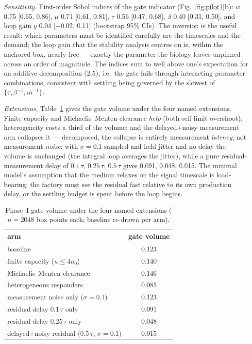 \documentclass[twoside,twocolumn,usenatbib]{mnras}
\begin{document}
\emph{Sensitivity.}  First-order Sobol indices of the gate indicator
(Fig.~\ref{fig:pilot1}b): $w$ 0.75 [0.65, 0.86], $\mu$ 0.71 [0.61,
0.81], $\tau$ 0.56 [0.47, 0.68], $\beta$ 0.40 [0.31, 0.50], and loop
gain $y$ 0.04 [$-0.02$, 0.11] (bootstrap 95\% CIs).  The inversion is
the useful result: which parameters must be identified carefully are
the timescales and the demand; the loop gain that the stability
analysis centres on is, within the anchored box, nearly free ---
exactly the parameter the biology leaves unpinned across an order of
magnitude.  The indices sum to well above one's expectation for an
additive decomposition (2.5), i.e.\ the gate fails through
interacting parameter combinations, consistent with settling being
governed by the slowest of $\{\tau, \beta^{-1}, m^{-1}\}$.

\emph{Extensions.}  Table~\ref{tab:ext} gives the gate volume under
the four named extensions.  Finite capacity and Michaelis--Menten
clearance \emph{help} (both self-limit overshoot); heterogeneity
costs a third of the volume; and the delayed+noisy measurement arm
collapses it --- decomposed, the collapse is entirely measurement
\emph{latency}, not measurement \emph{noise}: with $\sigma = 0.1$
sampled-and-held jitter and no delay the volume is unchanged (the
integral loop averages the jitter), while a pure residual-measurement
delay of $0.1\,\tau$, $0.25\,\tau$, $0.5\,\tau$ gives 0.091, 0.048,
0.015.  The minimal model's assumption that the medium relaxes on the
signal timescale is load-bearing: the factory must see the residual
fast relative to its own production delay, or the settling budget is
spent before the loop begins.

\begin{table}
\centering
\caption{Phase~I gate volume under the four named extensions
($n = 2048$ box points each; baseline re-drawn per arm).}
\label{tab:ext}
\begin{tabular}{lc}
\toprule
arm & gate volume \\
\midrule
baseline & 0.123 \\
finite capacity ($u \le 4u_0$) & 0.140 \\
Michaelis--Menten clearance & 0.146 \\
heterogeneous responders & 0.085 \\
measurement noise only ($\sigma = 0.1$) & 0.123 \\
residual delay $0.1\,\tau$ only & 0.091 \\
residual delay $0.25\,\tau$ only & 0.048 \\
delayed$+$noisy residual ($0.5\,\tau$, $\sigma=0.1$) & 0.015 \\
\bottomrule
\end{tabular}
\end{table}
\end{document}

